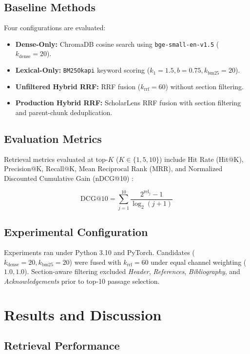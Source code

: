 \documentclass[conference]{IEEEtran}
\begin{document}
\subsection{Baseline Methods}

Four configurations are evaluated:
\begin{itemize}
    \item \textbf{Dense-Only:} ChromaDB cosine search using \texttt{bge-small-en-v1.5} ($k_{\text{dense}}=20$).
    \item \textbf{Lexical-Only:} \texttt{BM25Okapi} keyword scoring ($k_1=1.5, b=0.75, k_{\text{bm25}}=20$).
    \item \textbf{Unfiltered Hybrid RRF:} RRF fusion ($k_{\text{rrf}}=60$) without section filtering.
    \item \textbf{Production Hybrid RRF:} ScholarLens RRF fusion with section filtering and parent-chunk deduplication.
\end{itemize}

\subsection{Evaluation Metrics}

Retrieval metrics evaluated at top-$K$ ($K \in \{1, 5, 10\}$) include Hit Rate (Hit@K), Precision@K, Recall@K, Mean Reciprocal Rank (MRR), and Normalized Discounted Cumulative Gain (nDCG@10) \cite{jarvelin2002ndcg}:

\begin{equation}
\text{DCG}@10 = \sum_{j=1}^{10} \frac{2^{\text{rel}_j} - 1}{\log_2(j + 1)}
\end{equation}

\subsection{Experimental Configuration}

Experiments ran under Python 3.10 and PyTorch. Candidates ($k_{\text{dense}}=20, k_{\text{bm25}}=20$) were fused with $k_{\text{rrf}}=60$ under equal channel weighting ($1.0, 1.0$). Section-aware filtering excluded \textit{Header}, \textit{References}, \textit{Bibliography}, and \textit{Acknowledgements} prior to top-10 passage selection.

\section{Results and Discussion}

\subsection{Retrieval Performance}
\end{document}
